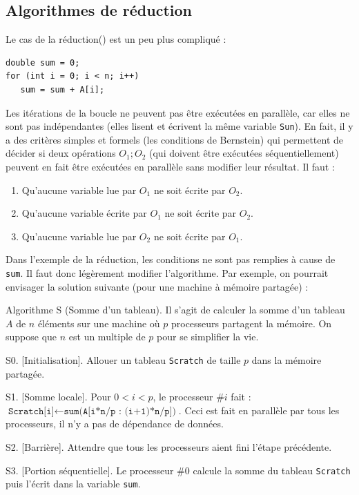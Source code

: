 \subsection{Algorithmes de \og réduction\fg}

Le cas de la \og réduction\fg () est un peu plus compliqué :
\begin{verbatim}
double sum = 0;
for (int i = 0; i < n; i++)
   sum = sum + A[i];
\end{verbatim}

Les itérations de la boucle ne peuvent pas être exécutées en parallèle, car
elles ne sont pas indépendantes (elles lisent et écrivent la même variable
\verb|Sun|). En fait, il y a des critères simples et formels (les \og conditions
de Bernstein\fg) qui permettent de décider si deux opérations $O_1; O_2$ (qui
doivent être exécutées séquentiellement) peuvent en fait être exécutées en
parallèle sans modifier leur résultat. Il faut :
\begin{enumerate}[$i$)]
\item Qu'aucune variable lue par $O_1$ ne soit écrite par $O_2$.
\item Qu'aucune variable écrite par $O_1$ ne soit écrite par $O_2$.
\item Qu'aucune variable lue par $O_2$ ne soit écrite par $O_1$.
\end{enumerate}

Dans l'exemple de la réduction, les conditions ne sont pas remplies à cause de
\verb|sum|. Il faut donc légèrement modifier l'algorithme. Par exemple, on
pourrait envisager la solution suivante (pour une machine à mémoire partagée) :

\algbegin Algorithme S (Somme d'un tableau). Il s'agit de calculer la somme d'un
tableau $A$ de $n$ éléments sur une machine où $p$ processeurs partagent la
mémoire. On suppose que $n$ est un multiple de $p$ pour se simplifier la vie.

\algstep S0. [Initialisation]. Allouer un tableau \texttt{Scratch} de taille $p$ dans la mémoire partagée.

\algstep S1. [Somme locale]. Pour $0 < i < p$, le processeur $\#i$ fait :
$\texttt{Scratch[i]} \gets \texttt{sum(A[i*n/p : (i+1)*n/p])}$. Ceci est fait en
parallèle par tous les processeurs, il n'y a pas de dépendance de données.

\algstep S2. [Barrière]. Attendre que tous les processeurs aient fini l'étape précédente.

\algstep S3. [Portion séquentielle]. Le processeur $\#0$ calcule la somme du
tableau \texttt{Scratch} puis l'écrit dans la variable \texttt{sum}.

